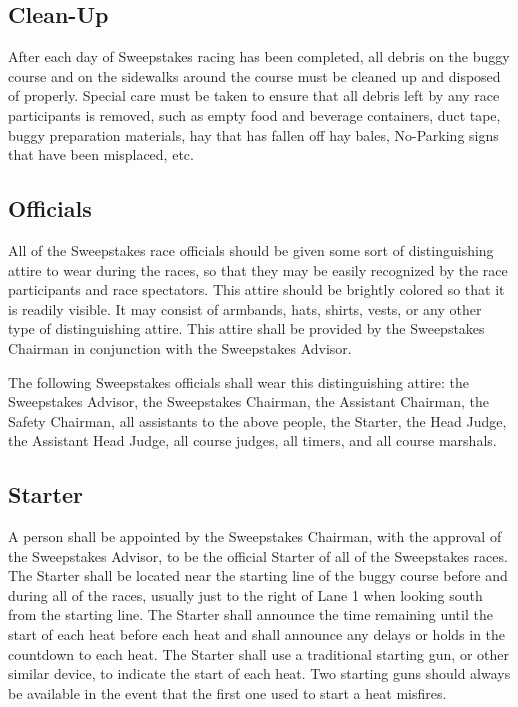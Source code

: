 \subsection{Clean-Up}

After each day of Sweepstakes racing has been completed, all debris on the buggy course and on the sidewalks around the course must be cleaned up and disposed of properly. Special care must be taken to ensure that all debris left by any race participants is removed, such as empty food and beverage containers, duct tape, buggy preparation materials, hay that has fallen off hay bales, No-Parking signs that have been misplaced, etc.

\subsection{Officials}

All of the Sweepstakes race officials should be given some sort of distinguishing attire to wear during the races, so that they may be easily recognized by the race participants and race spectators. This attire should be brightly colored so that it is readily visible. It may consist of armbands, hats, shirts, vests, or any other type of distinguishing attire. This attire shall be provided by the Sweepstakes Chairman in conjunction with the Sweepstakes Advisor.

The following Sweepstakes officials shall wear this distinguishing attire: the Sweepstakes Advisor, the Sweepstakes Chairman, the Assistant Chairman, the Safety Chairman, all assistants to the above people, the Starter, the Head Judge, the Assistant Head Judge, all course judges, all timers, and all course marshals.

\subsection{Starter}

A person shall be appointed by the Sweepstakes Chairman, with the approval of the Sweepstakes Advisor, to be the official Starter of all of the Sweepstakes races. The Starter shall be located near the starting line of the buggy course before and during all of the races, usually just to the right of Lane 1 when looking south from the starting line. The Starter shall announce the time remaining until the start of each heat before each heat and shall announce any delays or holds in the countdown to each heat. The Starter shall use a traditional starting gun, or other similar device, to indicate the start of each heat. Two starting guns should always be available in the event that the first one used to start a heat misfires.

